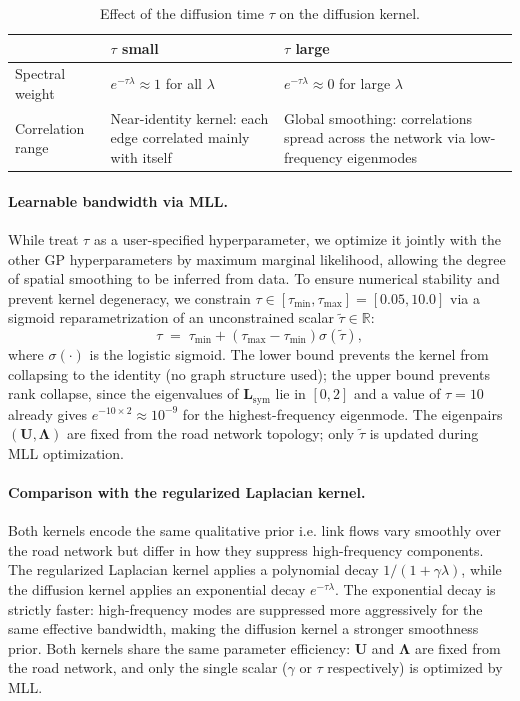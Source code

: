 \documentclass[11pt]{article}
\begin{document}
\begin{table}[ht]
\centering
\caption{Effect of the diffusion time $\tau$ on the diffusion kernel.}
\label{tab:diffusion-bandwidth}
\begin{tabular}{p{3cm}p{5.5cm}p{5.5cm}}
\toprule
 & \textbf{$\tau$ small} & \textbf{$\tau$ large} \\
\midrule
Spectral weight
    & $e^{-\tau\lambda} \approx 1$ for all $\lambda$
    & $e^{-\tau\lambda} \approx 0$ for large $\lambda$ \\[6pt]
Correlation range
    & Near-identity kernel: each edge correlated mainly with itself
    & Global smoothing: correlations spread across the network
      via low-frequency eigenmodes \\
\bottomrule
\end{tabular}
\end{table}

\paragraph{Learnable bandwidth via MLL.}
While \textcite{kondor2002diffusion} treat $\tau$ as a
user-specified hyperparameter, we optimize it jointly with
the other GP hyperparameters by maximum marginal likelihood,
allowing the degree of spatial smoothing to be inferred from data.
To ensure numerical stability and prevent kernel degeneracy, we
constrain $\tau \in [\tau_{\min}, \tau_{\max}] = [0.05, 10.0]$ via a
sigmoid reparametrization of an unconstrained scalar
$\tilde{\tau} \in \mathbb{R}$:
\begin{equation}
    \tau \;=\; \tau_{\min}
    + \left(\tau_{\max} - \tau_{\min}\right)\sigma(\tilde{\tau}),
    \label{eq:tau-sigmoid}
\end{equation}
where $\sigma(\cdot)$ is the logistic sigmoid. The lower bound prevents
the kernel from collapsing to the identity (no graph structure used);
the upper bound prevents rank collapse, since the eigenvalues of
$\mathbf{L}_{\mathrm{sym}}$ lie in $[0, 2]$ and a value of $\tau = 10$
already gives $e^{-10 \times 2} \approx 10^{-9}$ for the
highest-frequency eigenmode. The eigenpairs
$(\mathbf{U}, \boldsymbol{\Lambda})$ are fixed from the road network
topology; only $\tilde{\tau}$ is updated during MLL optimization.

\paragraph{Comparison with the regularized Laplacian kernel.}
Both kernels encode the same qualitative prior i.e. link flows vary
smoothly over the road network but differ in how they suppress
high-frequency components. The regularized Laplacian kernel applies a
polynomial decay $1/(1+\gamma\lambda)$, while the diffusion kernel
applies an exponential decay $e^{-\tau\lambda}$. The exponential decay
is strictly faster: high-frequency modes are suppressed more
aggressively for the same effective bandwidth, making the diffusion
kernel a stronger smoothness prior. Both kernels share the same
parameter efficiency: $\mathbf{U}$ and $\boldsymbol{\Lambda}$ are
fixed from the road network, and only the single scalar ($\gamma$ or
$\tau$ respectively) is optimized by MLL.
\end{document}
